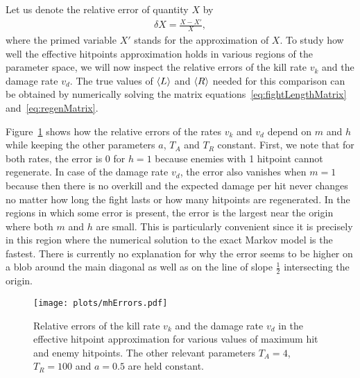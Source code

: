 Let us denote the relative error of quantity $X$ by
\begin{align}
	\delta X = \frac{X - X'}{X},
\end{align}
where the primed variable $X'$ stands for the approximation of $X$. To study how well the effective hitpoints approximation holds in various regions of the parameter space, we will now inspect the relative errors of the kill rate $v_k$ and the damage rate $v_d$. The true values of $\left\langle L \right\rangle$ and $\left\langle R \right\rangle$ needed for this comparison can be obtained by numerically solving the matrix equations~\ref{eq:fightLengthMatrix} and~\ref{eq:regenMatrix}.

Figure~\ref{fig:mhErrors} shows how the relative errors of the rates $v_k$ and $v_d$ depend on $m$ and $h$ while keeping the other parameters $a$, $T_A$ and $T_R$ constant.
First, we note that for both rates, the error is 0 for $h=1$ because enemies with 1 hitpoint cannot regenerate. In case of the damage rate $v_d$, the error also vanishes when $m=1$ because then there is no overkill and the expected damage per hit never changes no matter how long the fight lasts or how many hitpoints are regenerated.
In the regions in which some error is present, the error is the largest near the origin where both $m$ and $h$ are small. This is particularly convenient since it is precisely in this region where the numerical solution to the exact Markov model is the fastest. There is currently no explanation for why the error seems to be higher on a blob around the main diagonal as well as on the line of slope $\frac{1}{2}$ intersecting the origin.
\begin{figure}[t]
	\centering
    \texttt{[image: plots/mhErrors.pdf]}
	\caption{Relative errors of the kill rate $v_k$ and the damage rate $v_d$ in the effective hitpoint approximation for various values of maximum hit and enemy hitpoints. The other relevant parameters $T_A=4$, $T_R=100$ and $a=0.5$ are held constant.}\label{fig:mhErrors}
\end{figure}

